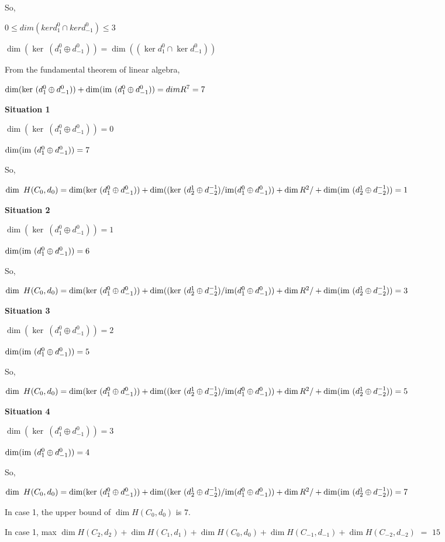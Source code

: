 \documentclass{amsart}
\theoremstyle{definition}
\newcommand{\im}{{\rm im}}
\begin{document}
So,

$0\leq {dim (ker d^0_{1} \cap ker d^0_{-1}) }\leq 3$

$\dim(\ker~(d^0_1\oplus d^0_{-1}))
= 
\dim ((\ker d^0_{1} \cap \ker d^0_{-1})) $

\bigskip
From the fundamental theorem of linear algebra,

$\dim(\ker~(d^0_1\oplus d^0_{-1}))
+
\dim(\im~(d^0_1\oplus d^0_{-1}))
= 
dim R^7
=7$



\bigskip
\textbf{Situation 1}

$\dim(\ker~(d^0_1\oplus d^0_{-1}))= 0$

$\dim(\im~(d^0_1\oplus d^0_{-1}))=7$

\bigskip
So,

$\dim~H(C_0,d_0)= 
\dim(\ker~(d^0_1\oplus d^0_{-1}))
+
\dim((\ker~(d^1_2\oplus d^{-1}_{-2})/\im(d^0_1\oplus d^0_{-1}))
+
\dim R^2/+
\dim (\im~(d^1_2\oplus d^{-1}_{-2}))
=1$



\bigskip
\textbf{Situation 2}

$\dim(\ker~(d^0_1\oplus d^0_{-1}))= 1$

$\dim(\im~(d^0_1\oplus d^0_{-1}))=6$

\bigskip
So,

$\dim~H(C_0,d_0)= 
\dim(\ker~(d^0_1\oplus d^0_{-1}))
+
\dim((\ker~(d^1_2\oplus d^{-1}_{-2})/\im(d^0_1\oplus d^0_{-1}))
+
\dim R^2/+
\dim (\im~(d^1_2\oplus d^{-1}_{-2}))
=3$


\bigskip
\textbf{Situation 3}

$\dim(\ker~(d^0_1\oplus d^0_{-1}))= 2$

$\dim(\im~(d^0_1\oplus d^0_{-1}))=5$

\bigskip
So,

$\dim~H(C_0,d_0)= 
\dim(\ker~(d^0_1\oplus d^0_{-1}))
+
\dim((\ker~(d^1_2\oplus d^{-1}_{-2})/\im(d^0_1\oplus d^0_{-1}))
+
\dim R^2/+
\dim (\im~(d^1_2\oplus d^{-1}_{-2}))
=5$

\bigskip
\textbf{Situation 4}

$\dim(\ker~(d^0_1\oplus d^0_{-1}))= 3$

$\dim(\im~(d^0_1\oplus d^0_{-1}))=4$

\bigskip
So,

$\dim~H(C_0,d_0)= 
\dim(\ker~(d^0_1\oplus d^0_{-1}))
+
\dim((\ker~(d^1_2\oplus d^{-1}_{-2})/\im(d^0_1\oplus d^0_{-1}))
+
\dim R^2/+
\dim (\im~(d^1_2\oplus d^{-1}_{-2}))
=7$


\bigskip
In case 1, the upper bound of $\dim H(C_0,d_0)$ is $7$.

\bigskip
In case 1, 
max{
$\dim H(C_2,d_2)
+
\dim H(C_1,d_1)
+
\dim H(C_0,d_0)
+
\dim H(C_{-1},d_{-1})
+
\dim H(C_{-2},d_{-2})$}
$=$
$15$





  
  
  



\bigskip

 
 
 
 
 
 
 
 
 
\end{document}
